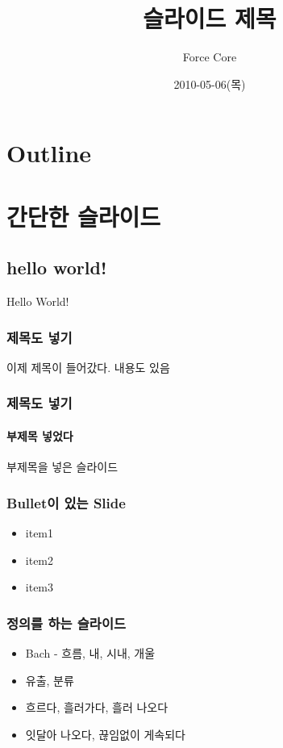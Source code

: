 \documentclass{beamer}
\begin{document}
\begin{frame}
	\title{슬라이드 제목}
	\author{Force Core}
	\date{2010-05-06(목)}
	\titlepage
\end{frame}



\section*{Outline}
\begin{frame}
\tableofcontents
\end{frame}



\section{간단한 슬라이드}

\subsection{hello world!}

\begin{frame}
	Hello World!
\end{frame}

\begin{frame}
	\frametitle{제목도 넣기}
	이제 제목이 들어갔다.
	내용도 있음
\end{frame}

\begin{frame}
	\frametitle{제목도 넣기}
	\framesubtitle{부제목 넣었다}
	부제목을 넣은 슬라이드
\end{frame}

\begin{frame}
	\frametitle{Bullet이 있는 Slide}
	\begin{itemize}
		\item item1
		\item item2
		\item item3
	\end{itemize}
\end{frame}

\begin{frame}
	\frametitle{정의를 하는 슬라이드}
	\begin{definition}[영어 단어 Stream]
		\begin{itemize}
			\item Bach - 흐름, 내, 시내, 개울
			\item 유출, 분류
			\item 흐르다, 흘러가다, 흘러 나오다
			\item 잇달아 나오다, 끊임없이 게속되다
		\end{itemize}
	\end{definition}
\end{frame}
\end{document}
